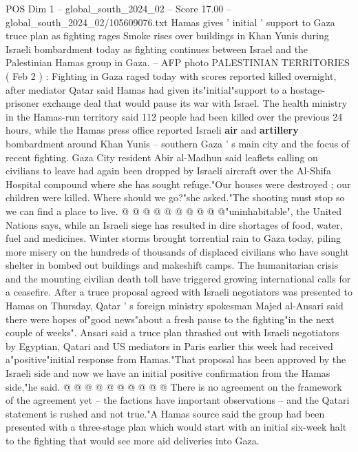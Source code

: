 \begin{textsample}{POS Dim 1 – global\_south\_2024\_02 – Score 17.00 – global\_south\_2024\_02/105609076.txt}  \label{ex:f1_pos_207}
Hamas gives ' initial ' support to Gaza truce plan as fighting rages Smoke rises over buildings in Khan Yunis during Israeli bombardment today as fighting continues between Israel and the Palestinian Hamas group in Gaza. -- AFP photo PALESTINIAN TERRITORIES ( Feb 2 ) : Fighting in Gaza raged today with scores reported killed overnight, after mediator Qatar said Hamas had given its"initial"support to a hostage-prisoner exchange deal that would pause its war with Israel.
The health ministry in the Hamas-run territory said 112 people had been killed over the previous 24 hours, while the Hamas press office reported Israeli \textbf{air} and \textbf{artillery} bombardment around Khan Yunis -- southern Gaza ' s main city and the focus of recent fighting.
Gaza City resident Abir al-Madhun said leaflets calling on civilians to leave had again been dropped by Israeli aircraft over the Al-Shifa Hospital compound where she has sought refuge."Our houses were destroyed ; our children were killed.
Where should we go?"she asked."The shooting must stop so we can find a place to live. @ @ @ @ @ @ @ @ @ @"uninhabitable", the United Nations says, while an Israeli siege has resulted in dire shortages of food, water, fuel and medicines.
Winter storms brought torrential rain to Gaza today, piling more misery on the hundreds of thousands of displaced civilians who have sought shelter in bombed out buildings and makeshift camps.
The humanitarian crisis and the mounting civilian death toll have triggered growing international calls for a ceasefire.
After a truce proposal agreed with Israeli negotiators was presented to Hamas on Thursday, Qatar ' s foreign ministry spokesman Majed al-Ansari said there were hopes of"good news"about a fresh pause to the fighting"in the next couple of weeks".
Ansari said a truce plan thrashed out with Israeli negotiators by Egyptian, Qatari and US mediators in Paris earlier this week had received a"positive"initial response from Hamas."That proposal has been approved by the Israeli side and now we have an initial positive confirmation from the Hamas side,"he said. @ @ @ @ @ @ @ @ @ @ There is no agreement on the framework of the agreement yet -- the factions have important observations -- and the Qatari statement is rushed and not true."A Hamas source said the group had been presented with a three-stage plan which would start with an initial six-week halt to the fighting that would see more aid deliveries into Gaza.

\end{textsample}
